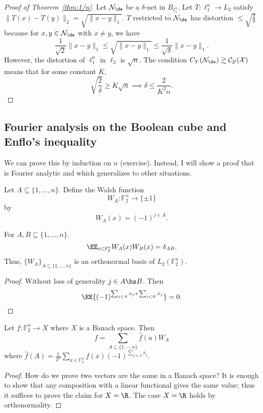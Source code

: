 \begin{proof}[Proof of Theorem~\ref{thm:1/n}]
Let $\cal N_\de$ be a $\delta$-net in $B_{\ell_1^n}$. Let $T: \ell_1^n \to L_2$ satisfy $\|T(x) - T(y)\|_2 = \sqrt{\|x - y\|_1}$. $T$ restricted to $\cal N_\de$ has distortion $\le\sqrt{\frac{2}{\delta}}$ because for $x, y \in \cal N_\de$ with $x \neq y$, 
we have
\[
\frac{1}{\sqrt{2}}\|x - y\|_1 \leq \sqrt{\|x - y\|_1} \leq \frac{1}{\sqrt{\delta}} \|x - y\|_1.
\]
However, the distortion of $\ell_1^n$ in $\ell_2$ is $\sqrt{n}$. The condition $C_Y(\cal N_\de)\gtrsim C_Y(X)$ means that for some constant $K$,  $$\sqrt{\frac{2}{\delta}} \geq K\sqrt{n} \implies \delta \leq \frac{2}{K^2n}.$$
\end{proof}


\subsection{Fourier analysis on the Boolean cube and Enflo's inequality}

We can prove this by induction on $n$ (exercise). Instead, I will show a proof that is Fourier analytic and which generalizes to other situations.


\begin{df}
Let $A \subseteq \{1, \ldots, n\}$. Define the Walsh function 
\[W_A: \mathbb{F}_2^n \to \{\pm 1\}\] by
\[W_A(x) = (-1)^{j \in A}.\]
\end{df}

\begin{pr}[Orthonormality]
For $A,B \subseteq \{1, \ldots, n\}$. 
\[\EE_{x \in \mathbb{F}_2^n}W_A(x)W_B(x) = \delta_{AB}.\]
Thus, $\{W_A\}_{A \subseteq \{1, \ldots, n\}}$ is an orthonormal basis of $L_2(\mathbb{F}_2^n)$.
\end{pr}

\begin{proof} 
Without loss of generality $j\in A\bs B$. Then
$$\EE{(-1)^{\sum_{j \in A} x_j + \sum_{j \in B} x_j}} = 0.$$ 
\end{proof}

\begin{cor}
Let $f: \mathbb{F}_2^n \to X$  where $X$ is a Banach space. Then
\[
f = \sum_{A \subseteq \{1, \cdots, n\}} \hat{f}(a)W_A
\]
where $\hat{f}(A) = \frac{1}{2^n}\sum_{x \in \mathbb{F}_2^n} f(x)(-1)^{\sum_{j \in A}x_j}$.
\end{cor}
\begin{proof}
How do we prove two vectors are the same in a Banach space? It is enough to show that any composition with a linear functional gives the same value; thus it suffices to prove the claim for $X=\R$. The case $X=\R$ holds by orthonormality.
\end{proof}

